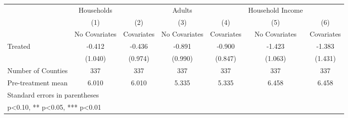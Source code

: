 {
\def\sym#1{\ifmmode^{#1}\else\(^{#1}\)\fi}
\begin{tabular}{l*{6}{c}}
\hline\hline
            &  Households   &               &      Adults   &               &Household Income   &               \\
            &\multicolumn{1}{c}{(1)}&\multicolumn{1}{c}{(2)}&\multicolumn{1}{c}{(3)}&\multicolumn{1}{c}{(4)}&\multicolumn{1}{c}{(5)}&\multicolumn{1}{c}{(6)}\\
            &\multicolumn{1}{c}{No Covariates}&\multicolumn{1}{c}{Covariates}&\multicolumn{1}{c}{No Covariates}&\multicolumn{1}{c}{Covariates}&\multicolumn{1}{c}{No Covariates}&\multicolumn{1}{c}{Covariates}\\
\hline
Treated     &      -0.412   &      -0.436   &      -0.891   &      -0.900   &      -1.423   &      -1.383   \\
            &     (1.040)   &     (0.974)   &     (0.990)   &     (0.847)   &     (1.063)   &     (1.431)   \\
\hline
Number of Counties&         337   &         337   &         337   &         337   &         337   &         337   \\
Pre-treatment mean&       6.010   &       6.010   &       5.335   &       5.335   &       6.458   &       6.458   \\
\hline\hline
\multicolumn{7}{l}{\footnotesize Standard errors in parentheses}\\
\multicolumn{7}{l}{\footnotesize * p<0.10, ** p<0.05, *** p<0.01}\\
\end{tabular}
}
